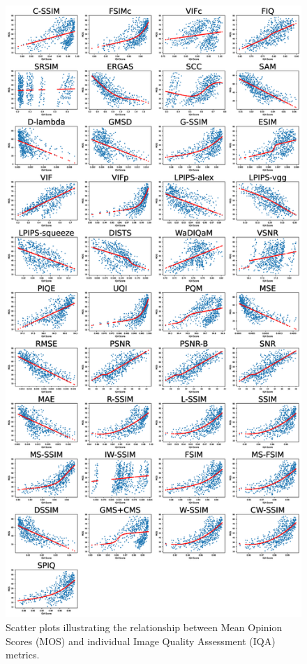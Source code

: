 \begin{figure}[h]
    \centering
    \includegraphics[width=\linewidth]{images/mos_vs_iqa_grid.eps}
    \caption{Scatter plots illustrating the relationship between Mean Opinion Scores (MOS) and individual Image Quality Assessment (IQA) metrics.}\label{fig:mos_vs_iqa}
\end{figure}

